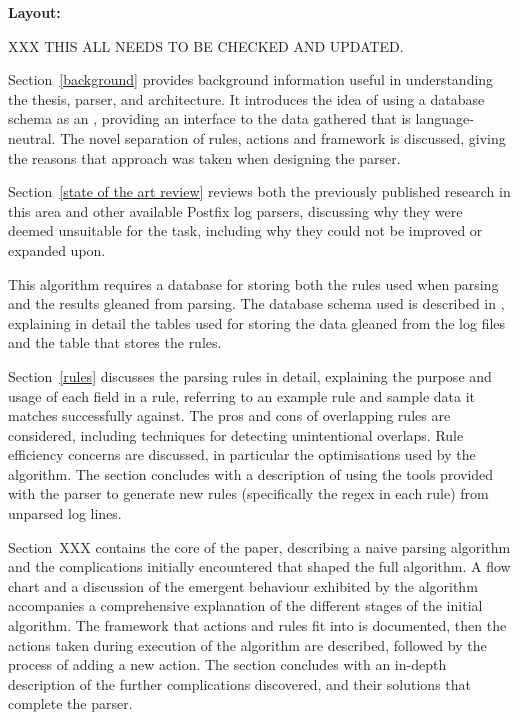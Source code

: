 \vspace{1em}\noindent\textbf{Layout:}

XXX THIS ALL NEEDS TO BE CHECKED AND UPDATED\@.

Section~\ref{background} provides background information useful in
understanding the thesis, parser, and architecture.  It introduces the idea
of using a database schema as an \API{}, providing an interface to the data
gathered that is language-neutral.  The novel separation of rules, actions
and framework is discussed, giving the reasons that approach was taken when
designing the parser.

Section~\ref{state of the art review} reviews both the previously published
research in this area and other available Postfix log parsers, discussing
why they were deemed unsuitable for the task, including why they could not
be improved or expanded upon.

This algorithm requires a database for storing both the rules used when
parsing and the results gleaned from parsing.  The database schema used is
described in , explaining in detail the tables
used for storing the data gleaned from the log files and the table that
stores the rules.

Section~\ref{rules} discusses the parsing rules in detail, explaining the
purpose and usage of each field in a rule, referring to an example rule and
sample data it matches successfully against.  The pros and cons of
overlapping rules are considered, including techniques for detecting
unintentional overlaps.  Rule efficiency concerns are discussed, in
particular the optimisations used by the algorithm.  The section concludes
with a description of using the tools provided with the parser to generate
new rules (specifically the regex in each rule) from unparsed log lines.

Section~XXX contains the core of the paper, describing
a naive parsing algorithm and the complications initially encountered that
shaped the full algorithm.  A flow chart and a discussion of the emergent
behaviour exhibited by the algorithm accompanies a comprehensive
explanation of the different stages of the initial algorithm.  The
framework that actions and rules fit into is documented, then the actions
taken during execution of the algorithm are described, followed by the
process of adding a new action.  The section concludes with an in-depth
description of the further complications discovered, and their solutions
that complete the parser.

